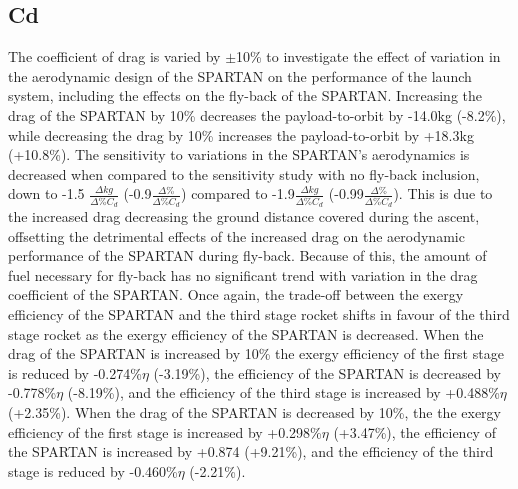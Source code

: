 \subsection{Cd}

The coefficient of drag is varied by $\pm$10\% to investigate the effect of variation in the aerodynamic design of the SPARTAN on the performance of the launch system, including the effects on the fly-back of the SPARTAN. 
Increasing the drag of the SPARTAN by 10\% decreases the payload-to-orbit by -14.0kg (-8.2\%), while decreasing the drag by 10\% increases the payload-to-orbit by +18.3kg (+10.8\%). 
The sensitivity to variations in the SPARTAN's aerodynamics is decreased when compared to the sensitivity study with no fly-back inclusion, down to -1.5 $\frac{\Delta kg}{\Delta\% C_{d}}$ (-0.9$\frac{\Delta \%}{\Delta\% C_{d}}$) compared to -1.9$\frac{\Delta kg}{\Delta\% C_{d}}$  (-0.99$\frac{\Delta \%}{\Delta\% C_{d}}$). 
This is due to the increased drag decreasing the ground distance covered during the ascent, offsetting the detrimental effects of the increased drag on the aerodynamic performance of the SPARTAN during fly-back. Because of this, the amount of fuel necessary for fly-back has no significant trend with variation in the drag coefficient of the SPARTAN. 
Once again, the trade-off between the exergy efficiency of the SPARTAN and the third stage rocket shifts in favour of the third stage rocket as the exergy efficiency of the SPARTAN is decreased. When the drag of the SPARTAN is increased by 10\% the exergy efficiency of the first stage is reduced by -0.274\%$\eta$ (-3.19\%), the efficiency of the SPARTAN is decreased by -0.778\%$\eta$ (-8.19\%), and the efficiency of the third stage is increased by +0.488\%$\eta$ (+2.35\%). When the drag of the SPARTAN is decreased by 10\%, the the exergy efficiency of the first stage is increased by +0.298\%$\eta$ (+3.47\%), the efficiency of the SPARTAN is increased by +0.874 (+9.21\%), and the efficiency of the third stage is reduced by -0.460\%$\eta$ (-2.21\%). 



